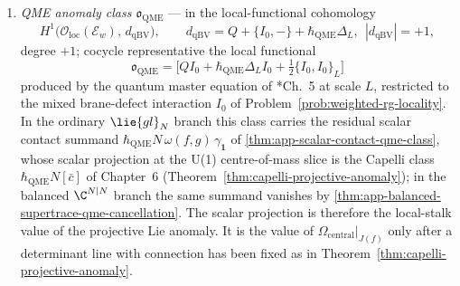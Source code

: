 \begin{defn}
\begin{enumerate}[label=(O\arabic*)]
      \(\Cat{MLTateChain}_{\geq0}^{\mathrm{str}}\) of
      \ref{defn:strict-ml-tate-category}, degree \(0\); cocycle
      representative the compatible family of recursion-induced
      transition defects
      \[
        \mathfrak o_{\mathrm{RG}}
        =\bigl[
          \mathrm{T}^{M,M-1}\circ
          W(P_{\epsilon,L},-)|_{\le M}
          -W(P_{\epsilon,L},-)|_{\le M-1}\circ\mathrm{T}^{M,M-1}
        \bigr]
        \in\varprojlim\nolimits^1_M H^0,
      \]
      where \(\mathrm{T}^{M,M-1}\) is the strict ML truncation of
      \ref{defn:strict-ml-tate-category} and
      \(W(P_{\epsilon,L},-)\) is the Costello recursion of
      \ref{rmk:t4-costello-renorm-datum}.
    \item \emph{QME anomaly class
      \(\mathfrak o_{\mathrm{QME}}\)} --- in the local-functional
      cohomology
      \[
        H^1\!\bigl(\mathcal O_{\mathrm{loc}}(\mathcal E_w),\,
          d_{\mathrm{qBV}}\bigr),
        \qquad
        d_{\mathrm{qBV}}=Q+\{I_0,-\}+\hbar_{\mathrm{QME}}\Delta_L,\ \ |d_{\mathrm{qBV}}|=+1,
      \]
      degree \(+1\); cocycle representative the local functional
      \[
        \mathfrak o_{\mathrm{QME}}
          =\bigl[QI_0+\hbar_{\mathrm{QME}}\Delta_LI_0
                 +\tfrac12\{I_0,I_0\}_L\bigr]
      \]
      produced by the quantum master equation of
      \cite{costello-renormalization}*{Ch.~5} at scale \(L\),
      restricted to the mixed brane-defect interaction \(I_0\) of
      Problem~\ref{prob:weighted-rg-locality}.  In the ordinary
      \(\lie{gl}_N\) branch this class carries the residual scalar
      contact summand
      \(\hbar_{\mathrm{QME}} N\,\omega(f,g)\,\gamma_{\mathbf 1}\) of
      \ref{thm:app-scalar-contact-qme-class}, whose scalar projection
      at the U(1) centre-of-mass slice is the Capelli class
      \(\hbar_{\mathrm{QME}} N[\bar c]\) of Chapter~6
      (Theorem~\ref{thm:capelli-projective-anomaly}); in the
      balanced \(\C^{N|N}\) branch the same summand vanishes by
      \ref{thm:app-balanced-supertrace-qme-cancellation}.  The scalar
      projection is therefore the local-stalk value of the projective
      Lie anomaly.  It is the value of
      \(\Omega_{\mathrm{central}}\big|_{J(f)}\) only after a determinant
      line with connection has been fixed as in
      Theorem~\ref{thm:capelli-projective-anomaly}.
  \end{enumerate}
\end{defn}

